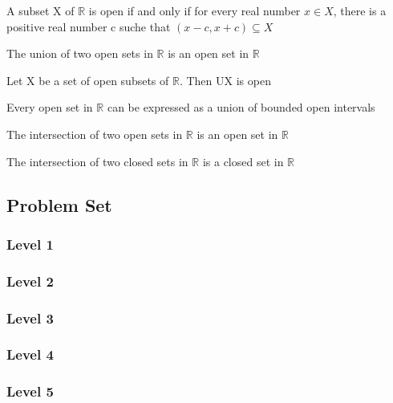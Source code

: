 \documentclass{article}
\begin{document}
\begin{theorem}
    A subset X of $\mathbb{R}$ is open if and only if for every real number
    $x \in X$, there is a positive real number c suche that $(x-c, x+c) \subseteq X$
\end{theorem}

\begin{theorem}
    The union of two open sets in $\mathbb{R}$ is an open set in $\mathbb{R}$
\end{theorem}

\begin{theorem}
    Let X be a set of open subsets of $\mathbb{R}$. Then UX is open
\end{theorem}

\begin{theorem}
    Every open set in $\mathbb{R}$ can be expressed as a union of bounded open
    intervals
\end{theorem}

\begin{theorem}
    The intersection of two open sets in $\mathbb{R}$ is an open set in $\mathbb{R}$
\end{theorem}

\begin{theorem}
    The intersection of two closed sets in $\mathbb{R}$ is a closed set in $\mathbb{R}$
\end{theorem}

\subsection{Problem Set}
\subsubsection{Level 1}
\subsubsection{Level 2}
\subsubsection{Level 3}
\subsubsection{Level 4}
\subsubsection{Level 5}
\pagebreak
\end{document}
